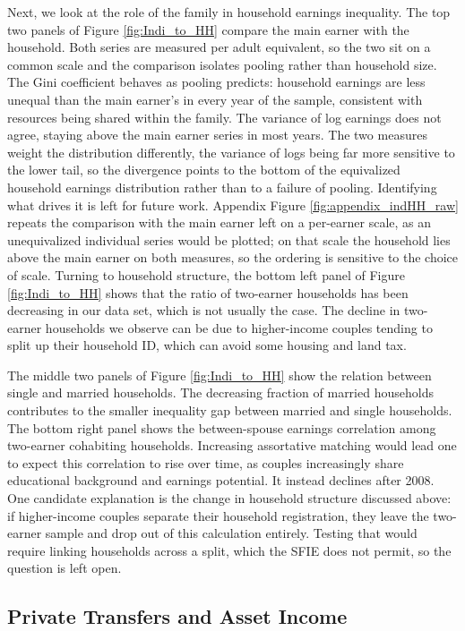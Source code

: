 \documentclass{article}
\begin{document}
Next, we look at the role of the family in household earnings inequality. The top two panels of Figure \ref{fig:Indi_to_HH} compare the main earner with the household. Both series are measured per adult equivalent, so the two sit on a common scale and the comparison isolates pooling rather than household size. The Gini coefficient behaves as pooling predicts: household earnings are less unequal than the main earner's in every year of the sample, consistent with resources being shared within the family. The variance of log earnings does not agree, staying above the main earner series in most years. The two measures weight the distribution differently, the variance of logs being far more sensitive to the lower tail, so the divergence points to the bottom of the equivalized household earnings distribution rather than to a failure of pooling. Identifying what drives it is left for future work. Appendix Figure \ref{fig:appendix_indHH_raw} repeats the comparison with the main earner left on a per-earner scale, as an unequivalized individual series would be plotted; on that scale the household lies above the main earner on both measures, so the ordering is sensitive to the choice of scale. Turning to household structure, the bottom left panel of Figure \ref{fig:Indi_to_HH} shows that the ratio of two-earner households has been decreasing in our data set, which is not usually the case. The decline in two-earner households we observe can be due to higher-income couples tending to split up their household ID, which can avoid some housing and land tax.

The middle two panels of Figure \ref{fig:Indi_to_HH} show the relation between single and married households. The decreasing fraction of married households contributes to the smaller inequality gap between married and single households. The bottom right panel shows the between-spouse earnings correlation among two-earner cohabiting households. Increasing assortative matching would lead one to expect this correlation to rise over time, as couples increasingly share educational background and earnings potential. It instead declines after 2008. One candidate explanation is the change in household structure discussed above: if higher-income couples separate their household registration, they leave the two-earner sample and drop out of this calculation entirely. Testing that would require linking households across a split, which the SFIE does not permit, so the question is left open.

\subsection{Private Transfers and Asset Income}
\end{document}
